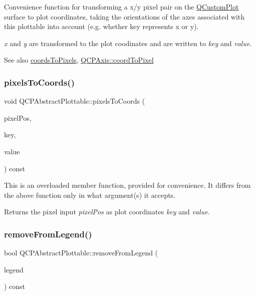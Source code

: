 Convenience function for transforming a x/y pixel pair on the \hyperlink{classQCustomPlot}{Q\+Custom\+Plot} surface to plot coordinates, taking the orientations of the axes associated with this plottable into account (e.\+g. whether key represents x or y).

{\itshape x} and {\itshape y} are transformed to the plot coodinates and are written to {\itshape key} and {\itshape value}.

\begin{DoxySeeAlso}{See also}
\hyperlink{classQCPAbstractPlottable_a7ad84a36472441cf1f555c5683d0da93}{coords\+To\+Pixels}, \hyperlink{classQCPAxis_af15d1b3a7f7e9b53d759d3ccff1fe4b4}{Q\+C\+P\+Axis\+::coord\+To\+Pixel} 
\end{DoxySeeAlso}
\mbox{\label{classQCPAbstractPlottable_a28d32c0062b9450847851ffdee1c5f69}} 
\subsubsection{\texorpdfstring{pixels\+To\+Coords()}{pixelsToCoords()}\hspace{0.1cm}{\footnotesize\ttfamily [2/2]}}
{\footnotesize\ttfamily void Q\+C\+P\+Abstract\+Plottable\+::pixels\+To\+Coords (\begin{DoxyParamCaption}\item[{const Q\+PointF \&}]{pixel\+Pos,  }\item[{double \&}]{key,  }\item[{double \&}]{value }\end{DoxyParamCaption}) const}

This is an overloaded member function, provided for convenience. It differs from the above function only in what argument(s) it accepts.

Returns the pixel input {\itshape pixel\+Pos} as plot coordinates {\itshape key} and {\itshape value}. \mbox{\label{classQCPAbstractPlottable_a3cc235007e2343a65ad4f463767e0e20}} 
\subsubsection{\texorpdfstring{remove\+From\+Legend()}{removeFromLegend()}\hspace{0.1cm}{\footnotesize\ttfamily [1/2]}}
{\footnotesize\ttfamily bool Q\+C\+P\+Abstract\+Plottable\+::remove\+From\+Legend (\begin{DoxyParamCaption}\item[{\hyperlink{classQCPLegend}{Q\+C\+P\+Legend} $\ast$}]{legend }\end{DoxyParamCaption}) const}

